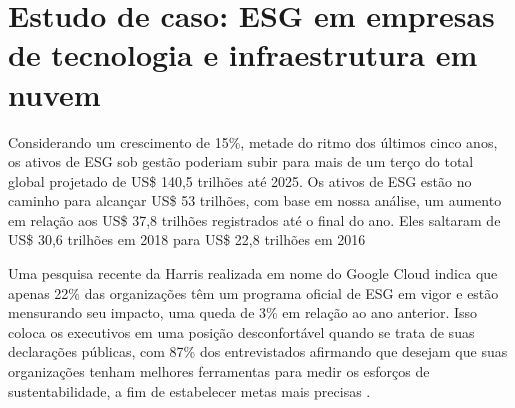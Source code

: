 \documentclass[12pt]{article}
\begin{document}
	\section*{Estudo de caso: ESG em empresas de tecnologia e infraestrutura em nuvem}
	
	Considerando um crescimento de 15\%, metade do ritmo dos últimos cinco anos, os ativos de ESG sob gestão poderiam subir para mais de um terço do total global projetado de US\$ 140,5 trilhões até 2025. Os ativos de ESG estão no caminho para alcançar US\$ 53 trilhões, com base em nossa análise, um aumento em relação aos US\$ 37,8 trilhões registrados até o final do ano. Eles saltaram de US\$ 30,6 trilhões em 2018 para US\$ 22,8 trilhões em 2016 \cite{bloombergprofessionalservicesESGAssetsMay2021}
	
	Uma pesquisa recente da Harris realizada em nome do Google Cloud indica que apenas 22\% das organizações têm um programa oficial de ESG em vigor e estão mensurando seu impacto, uma queda de 3\% em relação ao ano anterior. Isso coloca os executivos em uma posição desconfortável quando se trata de suas declarações públicas, com 87\% dos entrevistados afirmando que desejam que suas organizações tenham melhores ferramentas para medir os esforços de sustentabilidade, a fim de estabelecer metas mais precisas \cite{}.
	
	
	
\end{document}
